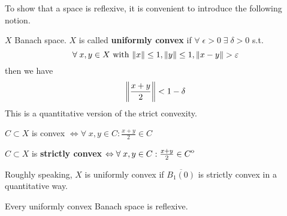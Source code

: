 To show that a space is reflexive, it is convenient to introduce the following notion.
\begin{definition}
    \(X\) Banach space. \(X\) is called \textbf{uniformly convex} if \(\forall \; \epsilon > 0 \; \exists \; \delta > 0 \) s.t. 
    \[
        \forall \; x, y \in X \mbox{ with } \norm{x} \leq 1, \norm{y} \leq 1, \norm{x-y} > \varepsilon
    \]
    then we have 
    \[
        \norm{\frac{x+y}{2}} < 1-\delta
    \]
    This is a quantitative version of the strict convexity.
\end{definition}
\begin{definition}
    \(C \subset X\) is convex  \(\Leftrightarrow \forall \; x,y \in C : \frac{x+y}{2} \in C\)

    \noindent \(C \subset X\) is \textbf{strictly convex} \(\Leftrightarrow \forall \; x,y \in C : \frac{x+y}{2} \in {\kern0ptC}^{\mathrm{o}}\)
\end{definition}
Roughly speaking, \(X\) is uniformly convex if \(\overline{B_1(0)}\) is strictly convex in a quantitative way.
\begin{theorem}
    Every uniformly convex Banach space is reflexive.
\end{theorem}